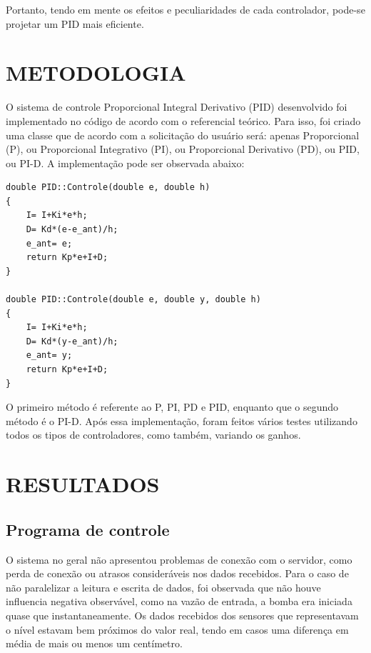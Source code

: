 \documentclass[a4paper,12pt]{article}
\begin{document}
Portanto, tendo em mente os efeitos e peculiaridades de cada controlador, pode-se projetar um PID mais eficiente.
\newpage


\thispagestyle{main}

\section{METODOLOGIA}

\hspace{4ex}O sistema de controle Proporcional Integral Derivativo (PID) desenvolvido foi implementado no código de acordo com o referencial teórico. Para isso, foi criado uma classe que de acordo com a solicitação do usuário será: apenas Proporcional (P), ou Proporcional Integrativo (PI), ou Proporcional Derivativo (PD), ou PID, ou PI-D. A implementação pode ser observada abaixo:

\begin{lstlisting}
double PID::Controle(double e, double h)
{
    I= I+Ki*e*h;
    D= Kd*(e-e_ant)/h;
    e_ant= e;
    return Kp*e+I+D;
}

double PID::Controle(double e, double y, double h)
{
    I= I+Ki*e*h;
    D= Kd*(y-e_ant)/h;
    e_ant= y;
    return Kp*e+I+D;
}
\end{lstlisting}

\hspace{4ex}O primeiro método é referente ao P, PI, PD e PID, enquanto que o segundo método é o PI-D.
\hspace{4ex}Após essa implementação, foram feitos vários testes utilizando todos os tipos de controladores, como também, variando os ganhos.

\newpage


\thispagestyle{main}

\section{RESULTADOS}

\hspace{4ex}

\subsection{Programa de controle}
O sistema no geral não apresentou problemas de conexão com o servidor, como perda de conexão ou atrasos consideráveis nos dados recebidos. Para o caso de não paralelizar a leitura e escrita de dados, foi observada que não houve influencia negativa observável, como na vazão de entrada, a bomba era iniciada quase que instantaneamente. Os dados recebidos dos sensores que representavam o nível estavam bem próximos do valor real, tendo em casos uma diferença em média de mais ou menos um centímetro. 
\end{document}
